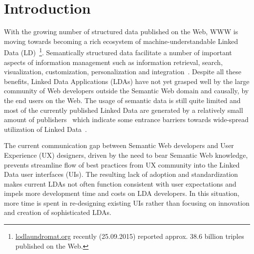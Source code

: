 \documentclass{acm_proc_article-sp}
\begin{document}




\section{Introduction}


With the growing number of structured data published on the Web, WWW is moving towards becoming a rich ecosystem of machine-understandable Linked Data (LD)~\footnote{\url{lodlaundromat.org} recently (25.09.2015) reported approx. 38.6 billion triples published on the Web.}.
Semantically structured data facilitate a number of important aspects of
information management such as information retrieval, search, visualization,  customization, personalization and integration~\cite{SCAJ-Khalili-2013}.
Despite all these benefits, Linked Data Applications (LDAs) have not yet grasped well by the large community of Web developers outside the Semantic Web domain and causally, by the end users on the Web.
The usage of semantic data is still quite limited and most of the currently published Linked Data are generated by a relatively small amount of publishers~\cite{ontowiki-swj} which indicate some entrance barriers towards wide-spread utilization of Linked Data~\cite{StegemannZ14}.

The current communication gap between Semantic Web developers and User Experience (UX) designers, driven by the need to bear Semantic Web knowledge, prevents streamline flow of best practices from UX community into the Linked Data user interfaces (UIs).
The resulting lack of adoption and standardization makes current LDAs not often function consistent with user expectations and impels more development time and costs on LDA developers.
In this situation, more time is spent in re-designing existing UIs rather than focusing on innovation and creation of sophisticated LDAs.
 
\end{document}
